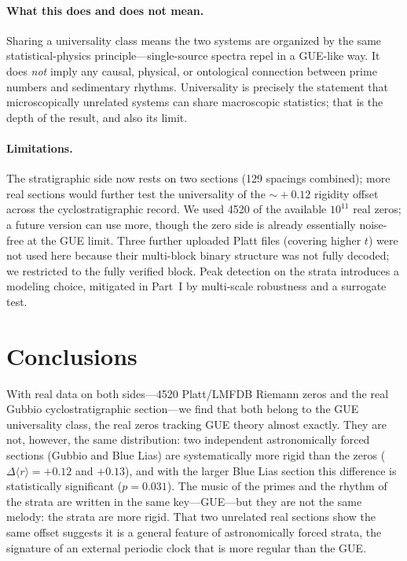 \documentclass[12pt,a4paper]{article}
\begin{document}
\paragraph{What this does and does not mean.} Sharing a universality class means the two systems are organized by the same statistical-physics principle---single-source spectra repel in a GUE-like way. It does \emph{not} imply any causal, physical, or ontological connection between prime numbers and sedimentary rhythms. Universality is precisely the statement that microscopically unrelated systems can share macroscopic statistics; that is the depth of the result, and also its limit.

\paragraph{Limitations.} The stratigraphic side now rests on two sections (129 spacings combined); more real sections would further test the universality of the $\sim\!+0.12$ rigidity offset across the cyclostratigraphic record. We used 4520 of the available $10^{11}$ real zeros; a future version can use more, though the zero side is already essentially noise-free at the GUE limit. Three further uploaded Platt files (covering higher $t$) were not used here because their multi-block binary structure was not fully decoded; we restricted to the fully verified block. Peak detection on the strata introduces a modeling choice, mitigated in Part~I by multi-scale robustness and a surrogate test.

\section{Conclusions}
With real data on both sides---4520 Platt/LMFDB Riemann zeros and the real Gubbio cyclostratigraphic section---we find that both belong to the GUE universality class, the real zeros tracking GUE theory almost exactly. They are not, however, the same distribution: two independent astronomically forced sections (Gubbio and Blue Lias) are systematically more rigid than the zeros ($\Delta\langle r\rangle=+0.12$ and $+0.13$), and with the larger Blue Lias section this difference is statistically significant ($p=0.031$). The music of the primes and the rhythm of the strata are written in the same key---GUE---but they are not the same melody: the strata are more rigid. That two unrelated real sections show the same offset suggests it is a general feature of astronomically forced strata, the signature of an external periodic clock that is more regular than the GUE.
\end{document}
